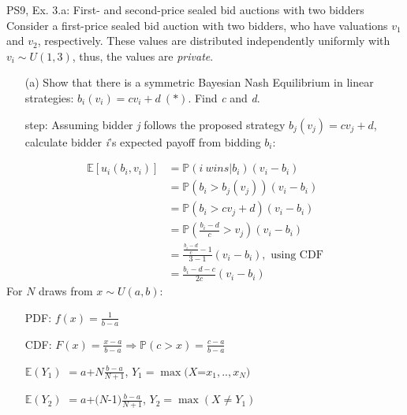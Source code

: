 \begin{frame}{PS9, Ex. 3.a: First- and second-price sealed bid auctions with two bidders}
    Consider a first-price sealed bid auction with two bidders, who have valuations $v_1$ and $v_2$, respectively. These values are distributed independently uniformly with $v_i\sim U(1,3)$, thus, the values are \textit{private}.
    \vspace{-4pt}
    \begin{itemize}
      \item[(a)] Show that there is a symmetric Bayesian Nash Equilibrium in linear strategies: $b_i(v_i) = cv_i + d\ (*)$. Find \textit{c} and \textit{d}.
    \end{itemize}
    \vspace{-8pt}
    \begin{multicols}{2}
      \begin{itemize}
        \item[\nth{1} step:] Assuming bidder \textit{j} follows the proposed strategy $b_j(v_j) = cv_j + d$, calculate bidder \textit{i}'s expected payoff from bidding $b_i$:
      \end{itemize}
      \vspace{-4pt}
      \begin{align*}
        \mathbb{E}[u_i(b_i,v_i)]&=\mathbb{P}(i\ wins|b_i)(v_i-b_i)\\
                                &=\mathbb{P}(b_i>b_j(v_j))(v_i-b_i)\\
                                &=\mathbb{P}(b_i>cv_j+d)(v_i-b_i)\\
                                &=\mathbb{P}\left(\frac{b_i-d}{c}>v_j\right)(v_i-b_i)\\
                                &=\frac{\frac{b_i-d}{c}-1}{3-1}(v_i-b_i),\text{ using CDF}\\
                                &=\frac{b_i-d-c}{2c}(v_i-b_i)
      \end{align*}
      \vfill\null\columnbreak
      For $N$ draws from $x\sim U(a, b):$
      \vspace{-6pt}
      \begin{enumerate}
        \item[PDF:] $f(x)=\frac{1}{b-a}$
        \item[CDF:] $F(x)=\frac{x-a}{b-a}\Rightarrow\mathbb{P}(c>x)=\frac{c-a}{b-a}$
        \item[$\mathbb{E}(Y_1)$] $=a$+$N\frac{b-a}{N+1}$, $Y_1=\max(X$=$x_1,..,x_N)$
        \item[$\mathbb{E}(Y_2)$] $=a$+$(N$-1$)\frac{b-a}{N+1}$, $Y_2=\max(X\neq Y_1)$
      \end{enumerate}
      \vfill\null
    \end{multicols}
\end{frame}
